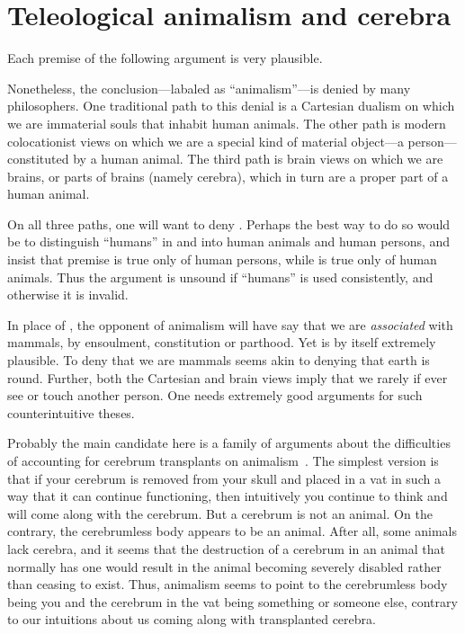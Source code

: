 \section{Teleological animalism and cerebra}
Each premise of the following argument is very plausible.

Nonetheless, the conclusion---labaled as ``animalism''---is denied by many philosophers. One traditional path to 
this denial is a Cartesian dualism on which we are immaterial souls that inhabit human animals. The other path 
is modern colocationist views on which we are a special kind of material object---a person---constituted by a human 
animal. The third path is brain views on which we are brains, or parts of brains (namely cerebra), which in turn are a 
proper part of a human animal. 

On all three paths, one will want to deny . Perhaps the best way to do so would be to distinguish ``humans'' 
in  and  into  human animals and human persons, and insist that premise  is true 
only of human persons, while  is true only of human animals. Thus the argument is unsound if ``humans'' is used 
consistently, and otherwise it is invalid. 

In place of , the opponent of animalism will have say that we are 
\textit{associated} with mammals, by ensoulment, constitution or parthood.   Yet  is by itself extremely plausible. 
To deny that we are mammals seems akin to denying that earth
is round. Further, both the Cartesian and brain views imply that we
rarely if ever see or touch another person. One needs extremely good arguments for such counterintuitive theses. 

Probably the main candidate here is a family of arguments about the difficulties of accounting for cerebrum transplants
on animalism~\parencite{OlsonWhat,OlsonWhat}. The simplest version is that if your cerebrum is removed from your skull and placed in a vat in such a way
that it can continue functioning, then intuitively you continue to think and will come along with the cerebrum. But a cerebrum
is not an animal. On the contrary, the cerebrumless body appears to be an animal. After all, some animals lack
cerebra, and it seems that the destruction of a cerebrum in an animal that normally has one would result in the animal 
becoming severely disabled rather than ceasing to exist. Thus, animalism seems to point to the cerebrumless body being you and 
the cerebrum in the vat being something or someone else, contrary to our intuitions about us coming along with 
transplanted cerebra.

